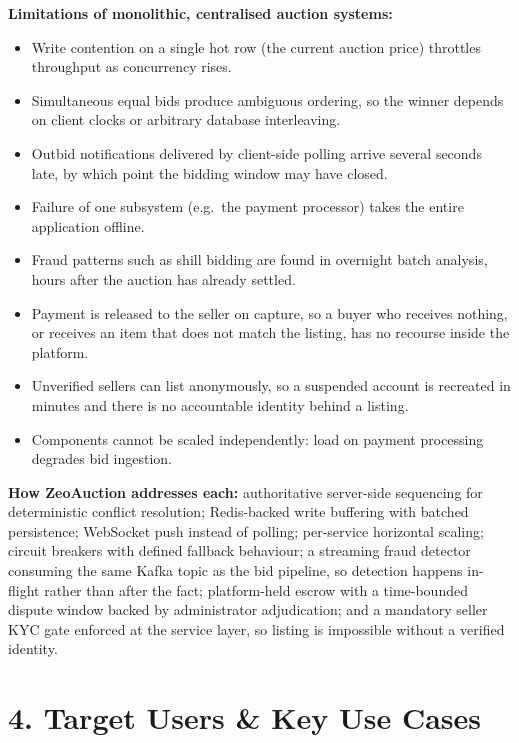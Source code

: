 \documentclass[11pt, a4paper]{article}
\newcommand{\secgap}{\vspace{0.06in}}
\begin{document}
\noindent\textbf{Limitations of monolithic, centralised auction systems:}
\begin{itemize}
    \item Write contention on a single hot row (the current auction price) throttles
          throughput as concurrency rises.
    \item Simultaneous equal bids produce ambiguous ordering, so the winner depends on
          client clocks or arbitrary database interleaving.
    \item Outbid notifications delivered by client-side polling arrive several seconds
          late, by which point the bidding window may have closed.
    \item Failure of one subsystem (e.g.\ the payment processor) takes the entire
          application offline.
    \item Fraud patterns such as shill bidding are found in overnight batch analysis,
          hours after the auction has already settled.
    \item Payment is released to the seller on capture, so a buyer who receives nothing,
          or receives an item that does not match the listing, has no recourse inside the
          platform.
    \item Unverified sellers can list anonymously, so a suspended account is recreated in
          minutes and there is no accountable identity behind a listing.
    \item Components cannot be scaled independently: load on payment processing degrades
          bid ingestion.
\end{itemize}

\noindent\textbf{How ZeoAuction addresses each:} authoritative server-side sequencing for
deterministic conflict resolution; Redis-backed write buffering with batched persistence;
WebSocket push instead of polling; per-service horizontal scaling; circuit breakers with
defined fallback behaviour; a streaming fraud detector consuming the same Kafka topic as
the bid pipeline, so detection happens in-flight rather than after the fact; platform-held
escrow with a time-bounded dispute window backed by administrator adjudication; and a
mandatory seller KYC gate enforced at the service layer, so listing is impossible without
a verified identity.

\secgap
\section*{4. Target Users \& Key Use Cases}
\end{document}
